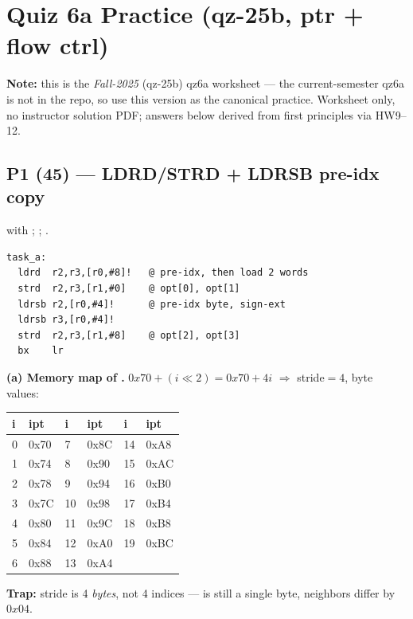 \section{Quiz 6a Practice (qz-25b, ptr + flow ctrl)}

\textbf{Note:} this is the \emph{Fall-2025} (qz-25b) qz6a worksheet --- the
current-semester qz6a is not in the repo, so use this version as the
canonical practice. Worksheet only, no instructor solution PDF; answers
below derived from first principles via HW9--12.

\subsection{P1 (45) --- LDRD/STRD + LDRSB pre-idx copy}
\begin{qp}
 with ;
; .
\begin{lstlisting}
task_a:
  ldrd  r2,r3,[r0,#8]!   @ pre-idx, then load 2 words
  strd  r2,r3,[r1,#0]    @ opt[0], opt[1]
  ldrsb r2,[r0,#4]!      @ pre-idx byte, sign-ext
  ldrsb r3,[r0,#4]!
  strd  r2,r3,[r1,#8]    @ opt[2], opt[3]
  bx    lr
\end{lstlisting}
\end{qp}

\textbf{(a) Memory map of .}
$0x70+(i\!\ll\!2) = 0x70+4i$ \;$\Rightarrow$ stride$=4$, byte values:
\begin{tabular}{@{}ll|ll|ll@{}}
\toprule
i & ipt & i & ipt & i & ipt \\
\midrule
0  & 0x70 & 7  & 0x8C & 14 & 0xA8 \\
1  & 0x74 & 8  & 0x90 & 15 & 0xAC \\
2  & 0x78 & 9  & 0x94 & 16 & 0xB0 \\
3  & 0x7C & 10 & 0x98 & 17 & 0xB4 \\
4  & 0x80 & 11 & 0x9C & 18 & 0xB8 \\
5  & 0x84 & 12 & 0xA0 & 19 & 0xBC \\
6  & 0x88 & 13 & 0xA4 &    &      \\
\bottomrule
\end{tabular}
\textbf{Trap:} stride is 4 \emph{bytes}, not 4 indices ---  is
still a single byte, neighbors differ by $0x04$.

